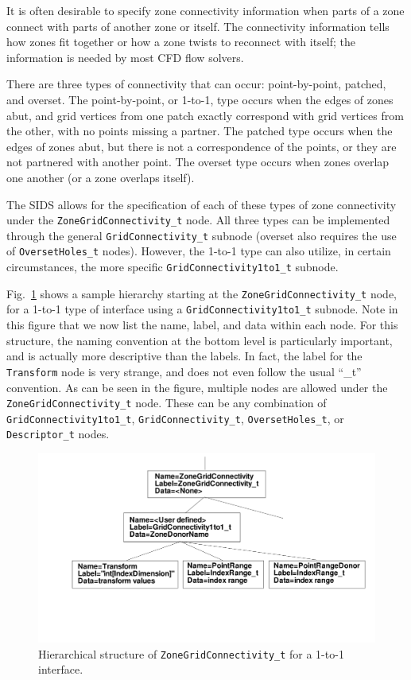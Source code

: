 \documentclass[12pt]{article}
\begin{document}
It is often desirable to specify zone connectivity information when
parts of a zone connect with parts of another zone or itself.  The
connectivity information tells how zones fit together or how a
zone twists to reconnect with itself; the information
is needed by most CFD flow solvers.

There are three types of connectivity that can occur:  point-by-point,
patched, and overset.  The point-by-point, or 1-to-1, type occurs
when the edges of zones abut, and grid vertices from one patch
exactly correspond with grid vertices from the other, with no
points missing a partner.  The patched type occurs when
the edges of zones abut, but there is not a correspondence of the
points, or they are not partnered with another point.  The 
overset type occurs when zones overlap one another (or a zone overlaps
itself).

The SIDS allows for the specification of each of these types of zone 
connectivity under the {\tt ZoneGridConnectivity\_t} node.  All three
types can be implemented through the general {\tt GridConnectivity\_t} 
subnode (overset also requires the use of {\tt OversetHoles\_t} nodes).
However, the 1-to-1 type can also utilize, in certain
circumstances, the more specific {\tt GridConnectivity1to1\_t} subnode.

Fig.~\ref{FIGconnectivity} shows a sample hierarchy starting at the
{\tt ZoneGridConnectivity\_t} node, for a 1-to-1 type of interface
using a {\tt GridConnectivity1to1\_t} subnode.  Note in this figure that
we now list the name, label, and data within each node.  For this
structure, the naming convention at the bottom level
is particularly important, and
is actually more descriptive than the labels.  In fact, the label
for the {\tt Transform} node is very strange, and does not even follow 
the usual ``\_t'' convention.
As can be seen in the figure, multiple nodes are allowed under
the {\tt ZoneGridConnectivity\_t} node.  These can be any combination of
{\tt GridConnectivity1to1\_t}, {\tt GridConnectivity\_t}, 
{\tt OversetHoles\_t}, or {\tt Descriptor\_t} nodes.

\begin{figure}[hpbt]
\centerline{{\includegraphics[width=150mm]{figures/connectivity}}}
\caption{Hierarchical structure of {\tt ZoneGridConnectivity\_t} for a
1-to-1 interface.}
\label{FIGconnectivity}
\end{figure}
%
\end{document}
